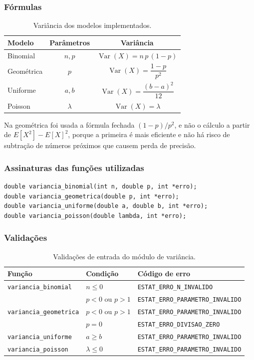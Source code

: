 \documentclass[12pt,a4paper]{article}
\newcommand{\cod}[1]{\texttt{#1}}
\begin{document}
\subsubsection{Fórmulas}
\begin{table}[h]
\centering
\begin{tabular}{@{}lcc@{}}
\toprule
Modelo & Parâmetros & Variância \\
\midrule
Binomial   & $n, p$        & $\operatorname{Var}(X) = n\,p\,(1-p)$ \\
Geométrica & $p$           & $\operatorname{Var}(X) = \dfrac{1-p}{p^{2}}$ \\
Uniforme   & $a, b$        & $\operatorname{Var}(X) = \dfrac{(b-a)^{2}}{12}$ \\
Poisson    & $\lambda$     & $\operatorname{Var}(X) = \lambda$ \\
\bottomrule
\end{tabular}
\caption{Variância dos modelos implementados.}
\end{table}

Na geométrica foi usada a fórmula fechada $(1-p)/p^{2}$, e não o cálculo a partir
de $E[X^2] - E[X]^2$, porque a primeira é mais eficiente e não há risco de subtração de números próximos que causem perda de precisão.


\subsubsection{Assinaturas das funções utilizadas}
\begin{lstlisting}
double variancia_binomial(int n, double p, int *erro);
double variancia_geometrica(double p, int *erro);
double variancia_uniforme(double a, double b, int *erro);
double variancia_poisson(double lambda, int *erro);
\end{lstlisting}

\subsubsection{Validações}
\begin{table}[h]
\centering
\small
\begin{tabular}{@{}lll@{}}
\toprule
Função & Condição & Código de erro \\
\midrule
\cod{variancia\_binomial}   & $n \le 0$             & \cod{ESTAT\_ERRO\_N\_INVALIDO} \\
                            & $p < 0$ ou $p > 1$    & \cod{ESTAT\_ERRO\_PARAMETRO\_INVALIDO} \\
\cod{variancia\_geometrica} & $p < 0$ ou $p > 1$    & \cod{ESTAT\_ERRO\_PARAMETRO\_INVALIDO} \\
                            & $p = 0$               & \cod{ESTAT\_ERRO\_DIVISAO\_ZERO} \\
\cod{variancia\_uniforme}   & $a \ge b$             & \cod{ESTAT\_ERRO\_PARAMETRO\_INVALIDO} \\
\cod{variancia\_poisson}    & $\lambda \le 0$       & \cod{ESTAT\_ERRO\_PARAMETRO\_INVALIDO} \\
\bottomrule
\end{tabular}
\caption{Validações de entrada do módulo de variância.}
\end{table}
\end{document}
